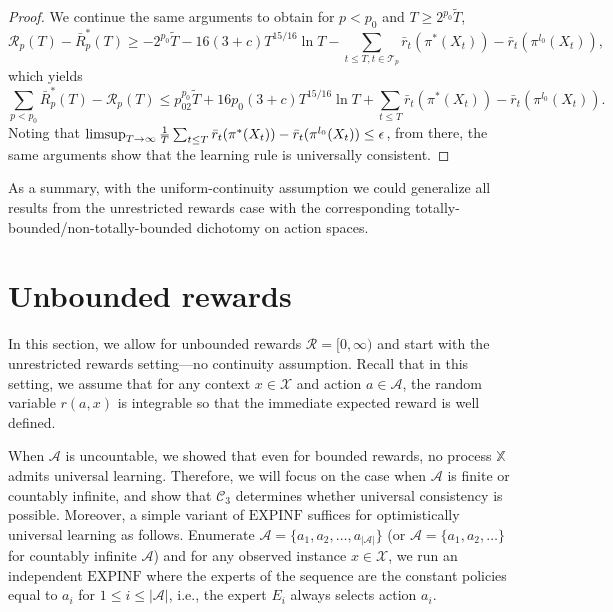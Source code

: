 \documentclass[aos]{imsart}
\theoremstyle{plain}
\theoremstyle{remark}
\newcommand{\Acal}{\mathcal{A}}
\newcommand{\Rcal}{\mathcal{R}}
\newcommand{\Tcal}{\mathcal{T}}
\newcommand{\Xcal}{\mathcal{X}}
\newcommand{\Xbb}{\mathbb{X}}
\newcommand{\1}{\mathbbm{1}}%
\newcommand{\EXPINF}{\mathrm{EXPINF}}
\newcommand{\A}{\mathcal A}
\renewcommand{\limsup}{\mathop{\rm limsup}}
\newcommand{\UKC}{\mathcal{C}_{3}}
\newcommand{\FS}{\UKC}
\begin{document}
\begin{proof}
We continue the same arguments to obtain for $p<p_0$ and $T\geq 2^{p_0}\tilde T$,
\begin{equation*}
    \Rcal_p(T)-\bar R^*_p(T) \geq -2^{p_0}\tilde T-16(3+c)T^{15/16}\ln T - \sum_{t\leq T, t\in\Tcal_p} \bar r_t(\pi^*(X_t)) - \bar r_t(\pi^{l_0}(X_t)),
\end{equation*}
which yields
\begin{equation*}
    \sum_{p<p_0} \bar R_p^*(T) - \Rcal_p(T)\leq p_02^{p_0}\tilde T + 16p_0(3+c)T^{15/16}\ln T +  \sum_{t\leq T} \bar r_t(\pi^*(X_t)) - \bar r_t(\pi^{l_0}(X_t)).
\end{equation*}
Noting that $\limsup_{T\to\infty}\frac{1}{T}\sum_{t\leq T} \bar r_t(\pi^*(X_t)) - \bar r_t(\pi^{l_0}(X_t)) \leq \epsilon$, from there, the same arguments show that the learning rule is universally consistent.
\end{proof}



As a summary, with the uniform-continuity assumption we could generalize all results from the unrestricted rewards case with the corresponding totally-bounded/non-totally-bounded dichotomy on action spaces.


\section{Unbounded rewards}
\label{sec:unbounded}

In this section, we allow for unbounded rewards $\Rcal=[0,\infty)$ and start with the unrestricted rewards setting---no continuity assumption. Recall that in this setting, we assume that for any context $x\in\Xcal$ and action $a\in\Acal$, the random variable $r(a, x)$ is integrable so that the immediate expected reward is well defined. 

When $\Acal$ is uncountable, we showed that even for bounded rewards, no process $\Xbb$ admits universal learning. Therefore, we will focus on the case when $\A$ is 
finite or countably infinite, and show that
$\FS$ determines whether universal 
consistency is possible. Moreover, a simple variant of $\EXPINF$ suffices for optimistically universal learning as follows. Enumerate $\A = \{a_1,a_2,\ldots, a_{|\A|}\}$
(or $\A = \{a_1,a_2,\ldots\}$ for countably 
infinite $\A$) and for any observed instance $x\in\Xcal$, we run an independent $\EXPINF$ where the experts of the sequence are the constant policies equal to $a_i$ for $1\leq i \leq |\Acal|$, i.e., the expert $E_i$ always selects action $a_i$.
\end{document}
